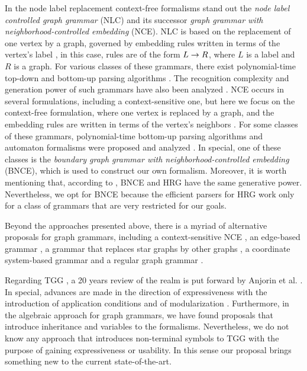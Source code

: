 In the node label replacement context-free formalisms stand out the  \textit{node label controlled graph grammar} (NLC) and its successor \textit{graph grammar with neighborhood-controlled embedding} (NCE). NLC is based on the replacement of one vertex by a graph, governed by embedding rules written in terms of the vertex's label \cite{rozenberg1986boundary}, in this case, rules are of the form $L \to R$, where $L$ is a label and $R$ is a graph. For various classes of these grammars, there exist polynomial-time top-down and bottom-up parsing algorithms \cite{flasinski1993parsing,flasinski2014characteristics, rozenberg1986boundary, wanke1991algorithms}. The recognition complexity and generation power of such grammars have also been analyzed \cite{flasinski1998power,kim2012structure}. NCE occurs in several formulations, including a context-sensitive one, but here we focus on the context-free formulation, where one vertex is replaced by a graph, and the embedding rules are written in terms of the vertex's neighbors \cite{janssens1982graph,skodinis1998neighborhood}. For some classes of these grammars, polynomial-time bottom-up parsing algorithms and automaton formalisms were proposed and analyzed \cite{kim2001efficient,brandenburg2005finite}. In special, one of these classes is the \textit{boundary graph grammar with neighborhood-controlled embedding} (BNCE), which is used to construct our own formalism. Moreover, it is worth mentioning that, according to \cite{engelfiet1990comparison}, BNCE and HRG have the same generative power. Nevertheless, we opt for BNCE because the efficient parsers for HRG \cite{drewes2015predictive, drewes2017predictive} work only for a class of grammars that are very restricted for our goals.

Beyond the approaches presented above, there is a myriad of alternative proposals for graph grammars, including a context-sensitive NCE \cite{adachi1999nce}, an edge-based grammar \cite{shi2015method}, a grammar that replaces star graphs by other graphs \cite{drewes2010adaptive}, a coordinate system-based grammar \cite{kong2006spatial} and a regular graph grammar \cite{gilroy2017parsing}.

Regarding TGG \cite{schurr1994specification}, a 20 years review of the realm is put forward by Anjorin et al. \cite{anjorin201620}. In special, advances are made in the direction of expressiveness with the introduction of application conditions \cite{klar2010extended} and of modularization \cite{anjorin2014modularizing}. Furthermore, in the algebraic approach for graph grammars, we have found proposals that introduce inheritance \cite{bardohl2004integrating,hermann2008typed} and variables \cite{hoffmann2005graph} to the formalisms. Nevertheless, we do not know any approach that introduces non-terminal symbols to TGG with the purpose of gaining expressiveness or usability. In this sense our proposal brings something new to the current state-of-the-art.